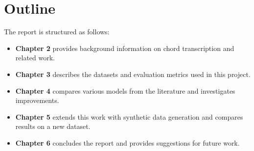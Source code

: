 \section{Outline}

The report is structured as follows:

\begin{itemize}
    \item \textbf{Chapter 2} provides background information on chord transcription and related work.
    \item \textbf{Chapter 3} describes the datasets and evaluation metrics used in this project.
    \item \textbf{Chapter 4} compares various models from the literature and investigates improvements.
    \item \textbf{Chapter 5} extends this work with synthetic data generation and compares results on a new dataset.
    \item \textbf{Chapter 6} concludes the report and provides suggestions for future work.
\end{itemize}